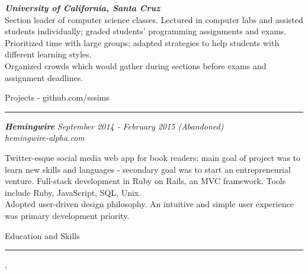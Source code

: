 \documentclass[10pt]{article}
\newcommand{\simsbullet}{{\raisebox{2pt}{\tiny $\bullet$}}\hspace{8pt}}
\begin{document}
\setlength{\leftskip}{0pt}

\vskip 12pt

{\bfseries\itshape\sffamily University of California, Santa Cruz} \hfill {\itshape{}} \\
{\itshape{}}
\vskip 4pt
\setlength{\leftskip}{16pt}
Section leader of computer science classes. Lectured in computer labs and assisted students individually; graded students' programming assignments and exams. 
\vskip 4pt
\simsbullet Prioritized time with large groups; adapted strategies to help students with different learning styles. \\
\simsbullet Organized crowds which would gather during sections before exams and assignment deadlines. 

\setlength{\leftskip}{0pt}

\vskip 14pt


{\Large\sffamily Projects {\small - github.com/sssims}}
\vskip 1pt
\hrule
\vskip 6pt
{\bfseries\itshape\sffamily Hemingwire} \hfill \textsf{\textit{September 2014 - February 2015 (Abandoned)}}\\
\textit{\textsf{hemingwire-alpha.com}} 

\setlength{\leftskip}{16pt}

Twitter-esque social media web app for book readers; main goal of project was to learn new skills and languages - secondary goal was to start an entrepreneurial venture. 
\vskip 4pt
\simsbullet Full-stack development in Ruby on Rails, an MVC framework. Tools include Ruby, JavaScript, SQL, Unix.\\
\simsbullet Adopted user-driven design philosophy. An intuitive and simple user experience was primary development priority.

\setlength{\leftskip}{0pt}

\vskip 16pt

{\Large\sffamily Education and Skills}
\vskip 4pt
\hrule
\vskip 6pt
{}
\vskip 2pt
\hspace*{12pt} {\itshape{}}, {} \\
\hspace*{12pt} {\itshape{}}
\end{document}
